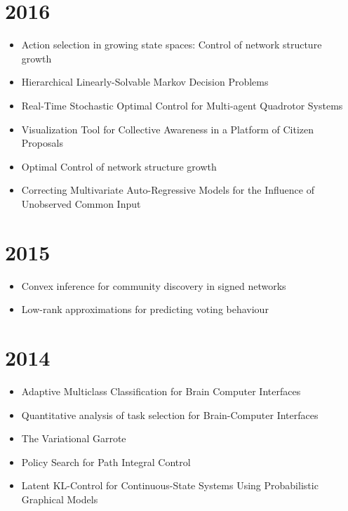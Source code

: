 \documentclass{article}
\begin{document}
\section*{2016}
\begin{itemize}
\item Action selection in growing state spaces: Control of network structure growth~\cite{klnetwork}
\item Hierarchical Linearly-Solvable Markov Decision Problems~\cite{hierarchical_lmdps}
\item Real-Time Stochastic Optimal Control for Multi-agent Quadrotor Systems~\cite{pi_uavs}
\item Visualization Tool for Collective Awareness in a Platform of Citizen Proposals~\cite{ICWSM1613046}
\item Optimal Control of network structure growth~\cite{dominiknips}
\item Correcting Multivariate Auto-Regressive Models for the Influence of Unobserved Common Input~\cite{gomez_ccia16}
\end{itemize}

\section*{2015}

\begin{itemize}
\item Convex inference for community discovery in signed networks~\cite{santamaria2015}
\item Low-rank approximations for predicting voting behaviour~\cite{porco2015}
\end{itemize}

\section*{2014}

\begin{itemize}
\item Adaptive Multiclass Classification for Brain Computer Interfaces~\cite{Llera_2014}
\item Quantitative analysis of task selection for Brain-Computer Interfaces~\cite{tasksel}
\item The Variational Garrote~\cite{Kappen2014}
\item Policy Search for Path Integral Control~\cite{pireps}
\item Latent KL-Control for Continuous-State Systems Using Probabilistic Graphical Models~\cite{latentkl}
\end{itemize}
\end{document}
